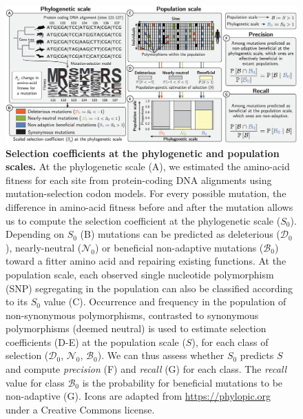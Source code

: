 \documentclass[10pt,letterpaper]{article}
\newcommand{\Sphy}{S_{0}}
\newcommand{\SphyDel}{\mathcal{D}_0}
\newcommand{\SphyNeu}{\mathcal{N}_0}
\newcommand{\SphyBen}{\mathcal{B}_0}
\newcommand{\Spop}{S}
\providecommand{\DIFaddbeginFL}{} %
\providecommand{\DIFaddendFL}{} %
\newcommand{\DIFaddincludegraphics}[2][]{{\color{blue}\fbox{\DIFOincludegraphics[#1]{#2}}}} %
\DeclareRobustCommand{\DIFaddbeginFL}{\DIFOaddbeginFL \let\includegraphics\DIFaddincludegraphics} %
\DeclareRobustCommand{\DIFaddendFL}{\DIFOaddendFL \let\includegraphics\DIFOincludegraphics} %
\begin{document}
\begin{figure}[!ht]
\begin{adjustwidth}{-2.25in}{0in} %
\centering
\includegraphics[width=1.4\textwidth, page=1] {figure2.eps}
\caption{
\DIFaddbeginFL {\bf \DIFaddendFL Selection coefficients at the phylogenetic and population scales.\DIFaddbeginFL }
\DIFaddendFL At the phylogenetic scale (A), we estimated the amino-acid fitness for each site from protein-coding DNA alignments using mutation-selection codon models.
For every possible mutation, the difference in amino-acid fitness before and after the mutation allows us to compute the selection coefficient at the phylogenetic scale ($\Sphy$).
Depending on $\Sphy$ (B) mutations can be predicted as deleterious ($\SphyDel$), nearly-neutral ($\SphyNeu$) or beneficial non-adaptive mutations ($\SphyBen$) toward a fitter amino acid and repairing existing functions.
At the population scale, each observed single nucleotide polymorphism (SNP) segregating in the population can also be classified according to its $\Sphy$ value (C).
Occurrence and frequency in the population of non-synonymous polymorphisms, contrasted to synonymous polymorphisms (deemed neutral) is used to estimate selection coefficients (D-E) at the population scale ($\Spop$), for each class of selection ($\SphyDel$, $\SphyNeu$, $\SphyBen$).
We can thus assess whether $\Sphy$ predicts $\Spop$ and compute \textit{precision} (F) and \textit{recall} (G) for each class.
The \textit{recall} value for class $\SphyBen$ is the probability for beneficial mutations to be non-adaptive (G).
Icons are adapted from \href{https://phylopic.org}{https://phylopic.org} under a Creative Commons license.
}
\label{fig:method}
\end{adjustwidth}
\end{figure}
\end{document}
